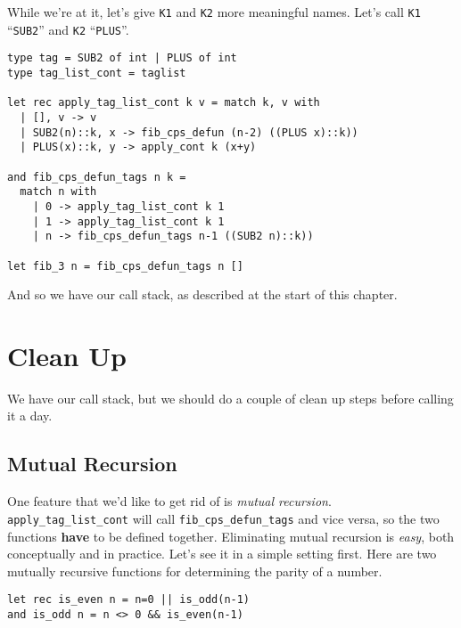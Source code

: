 While we're at it, let's give \texttt{K1} and \texttt{K2} more meaningful names. Let's call \texttt{K1} ``\texttt{SUB2}'' and \texttt{K2} ``\texttt{PLUS}''. 

\begin{code}
\label{code:defun-list-fib}
\begin{verbatim}
type tag = SUB2 of int | PLUS of int
type tag_list_cont = taglist

let rec apply_tag_list_cont k v = match k, v with
  | [], v -> v
  | SUB2(n)::k, x -> fib_cps_defun (n-2) ((PLUS x)::k))
  | PLUS(x)::k, y -> apply_cont k (x+y)

and fib_cps_defun_tags n k = 
  match n with
    | 0 -> apply_tag_list_cont k 1
    | 1 -> apply_tag_list_cont k 1
    | n -> fib_cps_defun_tags n-1 ((SUB2 n)::k))

let fib_3 n = fib_cps_defun_tags n []
\end{verbatim}
\end{code}

And so we have our call stack, as described at the start of this chapter.

\section{Clean Up}
We have our call stack, but we should do a couple of clean up steps before calling it a day. 

\subsection{Mutual Recursion}
One feature that we'd like to get rid of is \emph{mutual recursion}. \texttt{apply\_tag\_list\_cont} will call \texttt{fib\_cps\_defun\_tags} and vice versa, so the two functions \textbf{have} to be defined together. Eliminating mutual recursion is \emph{easy}, both conceptually and in practice. Let's see it in a simple setting first. Here are two mutually recursive functions for determining the parity of a number.

\begin{code}
\label{code:mutual-recursion}
\begin{verbatim}
let rec is_even n = n=0 || is_odd(n-1)
and is_odd n = n <> 0 && is_even(n-1)
\end{verbatim}
\end{code}

